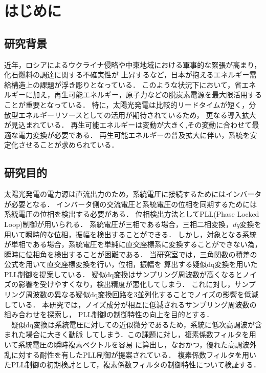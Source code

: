 

\section{はじめに}
\subsection{研究背景}
近年，ロシアによるウクライナ侵略や中東地域における軍事的な緊張が高まり，化石燃料の調達に関する不確実性が
上昇するなど，日本が抱えるエネルギー需給構造上の課題が浮き彫りとなっている．
このような状況下において，省エネルギーに加え，再生可能エネルギー，原子力などの脱炭素電源を最大限活用する
ことが重要となっている．
特に，太陽光発電は比較的リードタイムが短く，分散型エネルギーリソースとしての活用が期待されているため，
更なる導入拡大が見込まれている\cite{ref01}．
再生可能エネルギーは変動が大きく,その変動に合わせて最適な電力変換が必要である．
再生可能エネルギーの普及拡大に伴い，系統を安定化させることが求められている\cite{ref02}．
\subsection{研究目的}
太陽光発電の電力源は直流出力のため，系統電圧に接続するためにはインバータが必要となる．
インバータ側の交流電圧と系統電圧の位相を同期するためには系統電圧の位相を検出する必要がある．
位相検出方法としてPLL(Phase Locked Loop)制御が用いられる．
系統電圧が三相である場合，三相二相変換，$dq$変換を用いて瞬時的な位相，振幅を検出することができる．
しかし，対象となる系統が単相である場合，系統電圧を単純に直交座標系に変換することができない為，
瞬時に位相角を検出することが困難である．
当研究室では，三角関数の積差の公式を用いて直交座標変換を行い，位相，振幅を
算出する疑似dq変換を用いたPLL制御を提案している．
疑似dq変換はサンプリング周波数が高くなるとノイズの影響を受けやすくなり，検出精度が悪化してしまう．
これに対し，サンプリング周波数の異なる疑似dq変換回路を3並列化することでノイズの影響を低減している．
本研究では，ノイズ成分が相互に低減されるサンプリング周波数の組み合わせを探索し，
PLL制御の制御特性の向上を目的とする．\\
　疑似dq変換は系統電圧に対しての近似微分であるため，系統に低次高調波が含まれた場合に大きく動脈
してしまう．この課題に対し，複素係数フィルタを用いて系統電圧の瞬時複素ベクトルを容易
に算出し，なおかつ，優れた高調波外乱に対する耐性を有したPLL制御が提案されている\cite{ref03}．
複素係数フィルタを用いたPLL制御の初期検討として，複素係数フィルタの制御特性について検証する．

